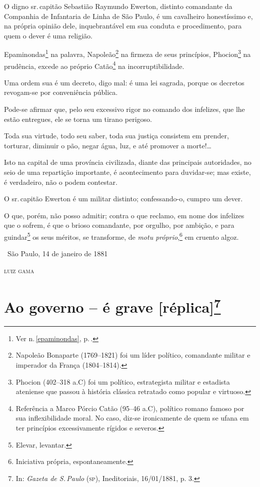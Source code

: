 O digno sr.\,capitão Sebastião Raymundo Ewerton, distinto comandante da
Companhia de Infantaria de Linha de São Paulo, é um cavalheiro
honestíssimo e, na própria opinião dele, inquebrantável em sua conduta e
procedimento, para quem o dever é uma religião.

Epaminondas\footnote{Ver n.\,\ref{epaminondas}, p.\,\pageref{epaminondas}.} na palavra, Napoleão\footnote{Napoleão Bonaparte 
  (1769--1821) foi um líder político, comandante militar e imperador da
  França (1804--1814).} na firmeza de seus princípios, Phocion\footnote{
  Phocion (402--318 a.C) foi um político, estrategista militar e
  estadista ateniense que passou à história clássica retratado como
  popular e virtuoso.} na prudência, excede ao próprio Catão\footnote{
  Referência a Marco Pórcio Catão (95--46 a.C), político romano famoso
  por sua inflexibilidade moral. No caso, diz-se ironicamente de quem se
  ufana em ter princípios excessivamente rígidos e severos.} na
incorruptibilidade.

Uma ordem sua é um decreto, digo mal: é uma lei sagrada, porque os
decretos revogam-se por conveniência pública.

Pode-se afirmar que, pelo seu excessivo rigor no comando dos infelizes,
que lhe estão entregues, ele se torna um tirano perigoso.

Toda sua virtude, todo seu saber, toda sua justiça consistem em prender,
torturar, diminuir o pão, negar água, luz, e até promover a
morte!\ldots{}

Isto na capital de uma província civilizada, diante das principais
autoridades, no seio de uma repartição importante, é acontecimento para
duvidar-se; mas existe, é verdadeiro, não o podem contestar.

O sr.\,capitão Ewerton é um militar distinto; confessando-o, cumpro um
dever.

O que, porém, não posso admitir; contra o que reclamo, em nome dos
infelizes que o sofrem, é que o brioso comandante, por orgulho, por
ambição, e para guindar\footnote{Elevar, levantar.} os seus méritos,
se transforme, de \emph{motu próprio},\footnote{Iniciativa
  própria, espontaneamente.} em cruento algoz.

\medskip
\hfill\ São Paulo, 14 de janeiro de 1881

\hfill\textsc{luiz gama}

\pagebreak
\section{Ao governo -- é grave {[}réplica{]}\protect\footnote{\MakeUppercase{I}n:
  \emph{\MakeUppercase{G}azeta de \MakeUppercase{S.\,P}aulo} (\textsc{sp}), \MakeUppercase{I}neditoriais, 16/01/1881, p. 3.}}

